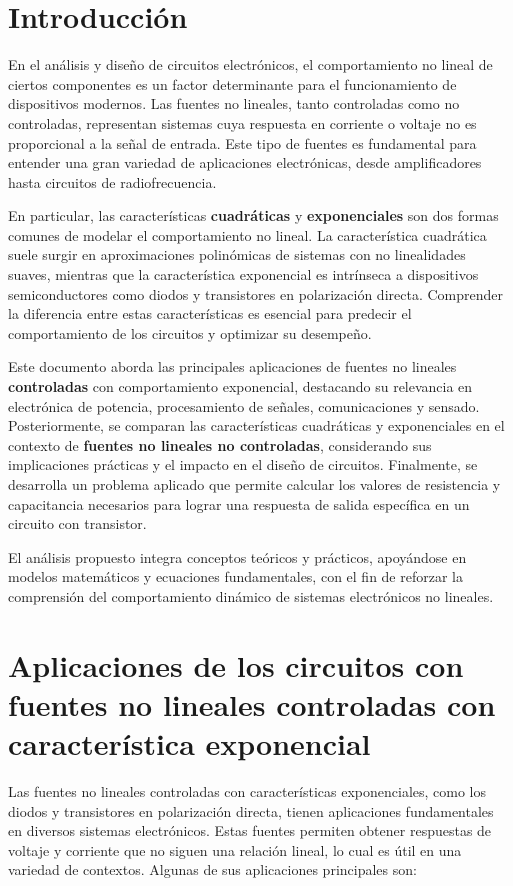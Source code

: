 



\section*{Introducción}

En el análisis y diseño de circuitos electrónicos, el comportamiento no lineal de ciertos componentes es un factor determinante para el funcionamiento de dispositivos modernos. Las fuentes no lineales, tanto controladas como no controladas, representan sistemas cuya respuesta en corriente o voltaje no es proporcional a la señal de entrada. Este tipo de fuentes es fundamental para entender una gran variedad de aplicaciones electrónicas, desde amplificadores hasta circuitos de radiofrecuencia.

En particular, las características \textbf{cuadráticas} y \textbf{exponenciales} son dos formas comunes de modelar el comportamiento no lineal. La característica cuadrática suele surgir en aproximaciones polinómicas de sistemas con no linealidades suaves, mientras que la característica exponencial es intrínseca a dispositivos semiconductores como diodos y transistores en polarización directa. Comprender la diferencia entre estas características es esencial para predecir el comportamiento de los circuitos y optimizar su desempeño.

Este documento aborda las principales aplicaciones de fuentes no lineales \textbf{controladas} con comportamiento exponencial, destacando su relevancia en electrónica de potencia, procesamiento de señales, comunicaciones y sensado. Posteriormente, se comparan las características cuadráticas y exponenciales en el contexto de \textbf{fuentes no lineales no controladas}, considerando sus implicaciones prácticas y el impacto en el diseño de circuitos. Finalmente, se desarrolla un problema aplicado que permite calcular los valores de resistencia y capacitancia necesarios para lograr una respuesta de salida específica en un circuito con transistor.

El análisis propuesto integra conceptos teóricos y prácticos, apoyándose en modelos matemáticos y ecuaciones fundamentales, con el fin de reforzar la comprensión del comportamiento dinámico de sistemas electrónicos no lineales.

\section{Aplicaciones de los circuitos con fuentes no lineales controladas con característica exponencial}
Las fuentes no lineales controladas con características exponenciales, como los diodos y transistores en polarización directa, tienen aplicaciones fundamentales en diversos sistemas electrónicos. Estas fuentes permiten obtener respuestas de voltaje y corriente que no siguen una relación lineal, lo cual es útil en una variedad de contextos. Algunas de sus aplicaciones principales son:

